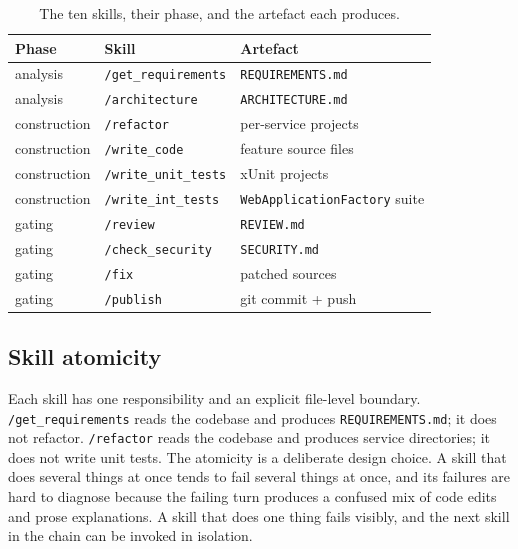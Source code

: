 \documentclass[journal]{IEEEtran}
\begin{document}
\begin{table}[t]
\caption{The ten skills, their phase, and the artefact each produces.}
\label{tab:skills}
\centering
\small
\begin{tabular}{lll}
\toprule
Phase            & Skill                          & Artefact \\
\midrule
analysis         & \texttt{/get\_requirements}    & \texttt{REQUIREMENTS.md} \\
analysis         & \texttt{/architecture}         & \texttt{ARCHITECTURE.md} \\
construction     & \texttt{/refactor}             & per-service projects \\
construction     & \texttt{/write\_code}          & feature source files \\
construction     & \texttt{/write\_unit\_tests}   & xUnit projects \\
construction     & \texttt{/write\_int\_tests}    & \texttt{WebApplicationFactory} suite \\
gating           & \texttt{/review}               & \texttt{REVIEW.md} \\
gating           & \texttt{/check\_security}      & \texttt{SECURITY.md} \\
gating           & \texttt{/fix}                  & patched sources \\
gating           & \texttt{/publish}              & git commit + push \\
\bottomrule
\end{tabular}
\end{table}

\subsection{Skill atomicity}

Each skill has one responsibility and an explicit file-level
boundary. \texttt{/get\_requirements} reads the codebase and
produces \texttt{REQUIREMENTS.md}; it does not refactor.
\texttt{/refactor} reads the codebase and produces service
directories; it does not write unit tests. The atomicity is a
deliberate design choice. A skill that does several things at once
tends to fail several things at once, and its failures are hard to
diagnose because the failing turn produces a confused mix of code
edits and prose explanations. A skill that does one thing fails
visibly, and the next skill in the chain can be invoked in
isolation.
\end{document}
